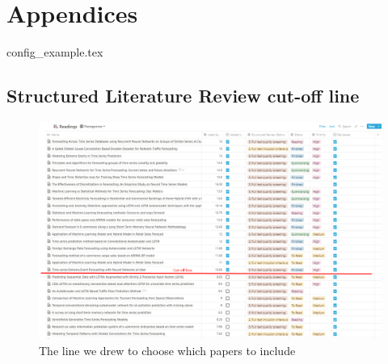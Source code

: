 
\chapter{Appendices}
\label{cha:appendices}
{config_example.tex}

\section{Structured Literature Review cut-off line}
\label{cha:slr-cut-off-line}

\begin{figure}[h!]
  \centering
  \includegraphics[width=\textwidth]{./figs/illustrations/LSR-cut-off-line.png}
  \hfill
  \caption{The line we drew to choose which papers to include}
  \label{fig:slr-cut-off-line}
\end{figure}

